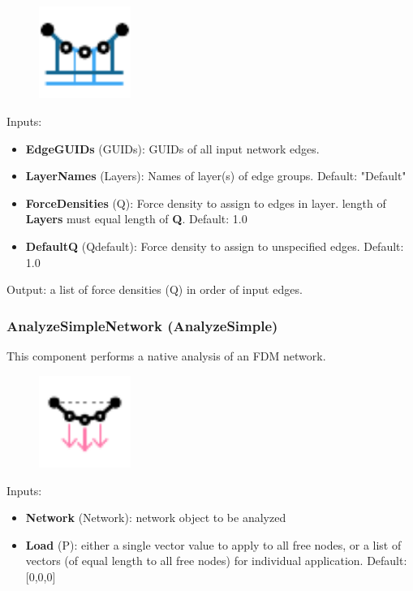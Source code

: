 \begin{figure}[h]
    \centering
    \includegraphics[width = 3cm]{Figures/Qbylayer}
\end{figure}

Inputs:
\begin{itemize}
    \setlength\itemsep{0.05em}
    \item \textbf{EdgeGUIDs} (GUIDs): GUIDs of all input network edges.
    \item \textbf{LayerNames} (Layers): Names of layer(s) of edge groups. {\color{gray} Default: "Default"}
    \item \textbf{ForceDensities} (Q): Force density to assign to edges in layer. {\color{kpink} length of \textbf{Layers} must equal length of \textbf{Q}}. {\color{gray} Default: 1.0}
    \item \textbf{DefaultQ} (Qdefault): Force density to assign to unspecified edges. {\color{gray} Default: 1.0} 
\end{itemize}

Output: a list of force densities (Q) in order of input edges.

\subsubsection{AnalyzeSimpleNetwork (AnalyzeSimple)}\label{AnalyzeSimple}
This component performs a native analysis of an FDM network. 

\begin{figure}[h]
    \centering
    \includegraphics[width = 3cm]{Figures/Analyze}
\end{figure}

Inputs:
\begin{itemize}
    \setlength\itemsep{0.05em}
    \item \textbf{Network} (Network): network object to be analyzed
    \item \textbf{Load} (P): either a single vector value to apply to all free nodes, or a list of vectors (of equal length to all free nodes) for individual application. {\color{gray} Default: [0,0,0]}
\end{itemize}

